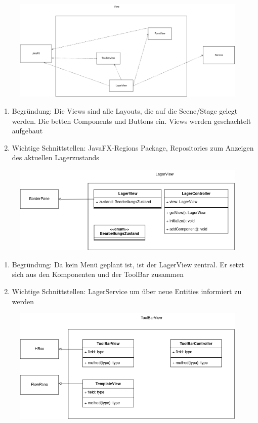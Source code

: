 \begin{figure}[H]
    \includegraphics[width=\linewidth]{images/bausteinsicht/Ebene3_View.png}
    \label{fig:Views}
\end{figure}
\begin{enumerate}
    \item Begründung: Die Views sind alle Layouts, die auf die Scene/Stage gelegt werden. Die betten Components und Buttons ein. Views werden geschachtelt aufgebaut
    \item Wichtige Schnittstellen: JavaFX-Regions Package, Repositories zum Anzeigen des aktuellen Lagerzustands
\end{enumerate}
\begin{figure}[H]
    \includegraphics[width=\linewidth]{images/bausteinsicht/Ebene4_LagerView.png}
    \label{fig:LagerView}
\end{figure}
\begin{enumerate}
    \item Begründung: Da kein Menü geplant ist, ist der LagerView zentral. Er setzt sich aus den Komponenten und der ToolBar zusammen
    \item Wichtige Schnittstellen: LagerService um über neue Entities informiert zu werden
\end{enumerate}
\begin{figure}[H]
    \includegraphics[width=\linewidth]{images/bausteinsicht/Ebene4_ToolBarView.png}
    \label{fig:ToolBarView}
\end{figure}
